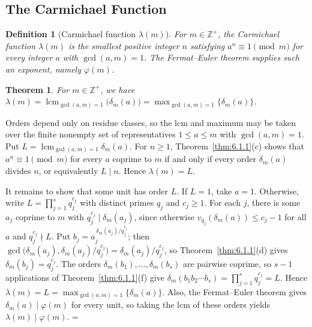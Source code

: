 \documentclass[11pt]{article}
\makeatletter
\let\nt@closedisplay\]
\def\nt@guardedclose{\@ifnextchar\par{\nt@closeafterpar}{\@ifnextchar\end{\postdisplaypenalty\@M\nt@closedisplay}{\nt@closedisplay}}}
\def\nt@closeafterpar\par{\@ifnextchar\par{\nt@closeafterpar}{\@ifnextchar\end{\postdisplaypenalty\@M\nt@closedisplay\par}{\nt@closedisplay\par}}}
\renewenvironment{proof}[1][\proofname]{\par
  \pushQED{\qed}\normalfont\topsep\medskipamount\edef\nt@afterproof{\@endparpenalty=\the\@endparpenalty\relax}\@beginparpenalty\@M\@endparpenalty\@M\let\]\nt@guardedclose\trivlist\item[]\textit{#1\@addpunct{.}} \ignorespaces}{\ifvmode\addpenalty\@M\fi\popQED\nt@afterproof\endtrivlist\@endpefalse}
\theoremstyle{ntstyle}
\newtheorem{theorem}{Theorem}[subsection]
\newtheorem{definition}{Definition}[subsection]
\DeclareMathOperator{\lcm}{lcm}
\makeatother
\begin{document}
\subsection{The Carmichael Function}

\begin{definition}[Carmichael function $\lambda(m)$]\label{def:6.4.1}\label{def:carmichael-function-lambda-m}
  For $m \in \mathbb{Z}^+$, the Carmichael function $\lambda(m)$ is
  the smallest positive integer $n$ satisfying $a^n\equiv1\pmod{m}$
  for every integer $a$ with $\gcd(a,m)=1$.
  The Fermat--Euler theorem supplies such an exponent, namely $\varphi(m)$.

\end{definition}

\begin{theorem}\label{thm:6.4.1}
  For $m\in\mathbb{Z}^+$, we have
  $\lambda(m) = \lcm_{\gcd(a, m)=1}\big(\delta_m(a)\big) = \max_{\gcd(a, m)=1}\{\delta_m(a)\}$.

\end{theorem}

\begin{proof} Orders depend only on residue classes, so the lcm and
  maximum may be taken over the finite nonempty set of representatives
  $1\le a\le m$ with $\gcd(a,m)=1$. Put
  $L=\lcm_{\gcd(a,m)=1}\delta_m(a)$.
  For $n\ge1$, Theorem~\ref{thm:6.1.1}(c) shows that $a^n\equiv1\pmod{m}$
  for every $a$ coprime to $m$ if and only if every order $\delta_m(a)$
  divides $n$, or equivalently $L\mid n$. Hence $\lambda(m)=L$.

  It remains to show that some unit has order $L$. If $L=1$, take $a=1$.
  Otherwise, write $L = \prod_{j=1}^{s} q_j^{c_j}$ with distinct primes $q_j$ and $c_j \ge 1$. For each $j$,
  there is some $a_j$ coprime to $m$ with $q_j^{c_j} \mid \delta_m(a_j)$, since otherwise
  $v_{q_j}(\delta_m(a)) \le c_j - 1$ for
  all $a$ and $q_j^{c_j} \nmid L$. Put $b_j = a_j^{\,\delta_m(a_j) / q_j^{c_j}}$; then
  $\gcd\big(\delta_m(a_j), \delta_m(a_j)/q_j^{c_j}\big) = \delta_m(a_j)/q_j^{c_j}$, so Theorem~\ref{thm:6.1.1}(d)
  gives $\delta_m(b_j) = q_j^{c_j}$. The orders $\delta_m(b_1), \ldots, \delta_m(b_s)$ are
  pairwise coprime, so $s-1$ applications of Theorem~\ref{thm:6.1.1}(f) give
  $\delta_m(b_1b_2\cdots b_s) = \prod_{j=1}^{s} q_j^{c_j} = L$. Hence
  $\lambda(m) = L = \max_{\gcd(a, m)=1}\{\delta_m(a)\}$.
  Also, the Fermat--Euler theorem gives $\delta_m(a)\mid\varphi(m)$ for
  every unit, so taking the lcm of these orders yields $\lambda(m)\mid\varphi(m)$.
\end{proof}
\end{document}
